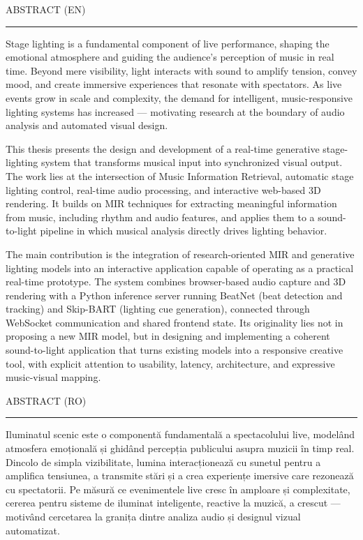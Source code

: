 \documentclass[12pt]{report}
\begin{document}
\newpage
\thispagestyle{empty}
\mbox{}
\newpage
{} 

\cleardoublepage
ABSTRACT (EN)
\vspace{0.5cm}	
\hrule
\vspace{0.5cm}	

Stage lighting is a fundamental component of live performance, shaping the emotional atmosphere and guiding the audience's perception of music in real time. Beyond mere visibility, light interacts with sound to amplify tension, convey mood, and create immersive experiences that resonate with spectators. As live events grow in scale and complexity, the demand for intelligent, music-responsive lighting systems has increased — motivating research at the boundary of audio analysis and automated visual design.

This thesis presents the design and development of a real-time generative stage-lighting system that transforms musical input into synchronized visual output. The work lies at the intersection of Music Information Retrieval, automatic stage lighting control, real-time audio processing, and interactive web-based 3D rendering. It builds on MIR techniques for extracting meaningful information from music, including rhythm and audio features, and applies them to a sound-to-light pipeline in which musical analysis directly drives lighting behavior.

The main contribution is the integration of research-oriented MIR and generative lighting models into an interactive application capable of operating as a practical real-time prototype. The system combines browser-based audio capture and 3D rendering with a Python inference server running BeatNet (beat detection and tracking) and Skip-BART (lighting cue generation), connected through WebSocket communication and shared frontend state. Its originality lies not in proposing a new MIR model, but in designing and implementing a coherent sound-to-light application that turns existing models into a responsive creative tool, with explicit attention to usability, latency, architecture, and expressive music-visual mapping.

\cleardoublepage
ABSTRACT (RO)
\vspace{0.5cm}
\hrule
\vspace{0.5cm}

Iluminatul scenic este o componentă fundamentală a spectacolului live, modelând atmosfera emoțională și ghidând percepția publicului asupra muzicii în timp real. Dincolo de simpla vizibilitate, lumina interacționează cu sunetul pentru a amplifica tensiunea, a transmite stări și a crea experiențe imersive care rezonează cu spectatorii. Pe măsură ce evenimentele live cresc în amploare și complexitate, cererea pentru sisteme de iluminat inteligente, reactive la muzică, a crescut — motivând cercetarea la granița dintre analiza audio și designul vizual automatizat.
\end{document}
